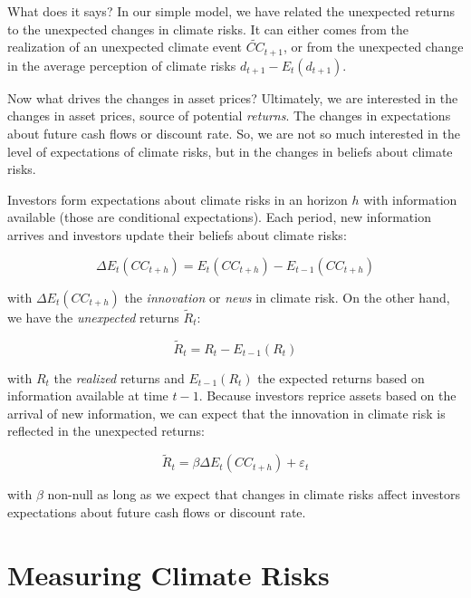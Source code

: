 What does it says? In our simple model, 
we have related the unexpected returns to the
unexpected changes in climate risks. It can 
either comes from the realization of an 
unexpected climate event $\tilde{CC}_{t+1}$,
or from the unexpected change in the average
perception of climate risks $d_{t+1} - E_t(d_{t+1})$.



Now what drives the changes in asset prices?
Ultimately, we are interested in the changes in asset prices,
source of potential \textit{returns}.
The changes in expectations about 
future cash flows or discount rate. 
So,
we are not so much interested in the level of
expectations of climate risks, but in the changes
in beliefs about climate risks.

Investors form expectations about climate risks
in an horizon $h$ with information available (those 
are conditional expectations).
Each period, new information arrives and investors
update their beliefs about climate risks:

\begin{equation}
    \Delta E_t (CC_{t+h}) = E_t(CC_{t+h}) - E_{t-1}(CC_{t+h})
\end{equation}

with $\Delta E_t (CC_{t+h})$ the \textit{innovation} or 
\textit{news} in climate risk. On the other hand, we have the \textit{unexpected} returns $\tilde{R}_t$:

\begin{equation}
    \tilde{R}_t = R_t - E_{t-1}(R_t)
\end{equation}

with $R_t$ the \textit{realized} returns 
and $E_{t-1}(R_t)$ the expected returns based on information available at time $t-1$.
Because investors reprice assets based on the arrival of new information,
we can expect that the innovation in climate risk is reflected in the unexpected returns:

\begin{equation}
    \tilde{R}_t = \beta \Delta E_t(CC_{t+h}) + \varepsilon_t
\end{equation}


with $\beta$ non-null as long as we expect 
that changes in climate risks affect investors 
expectations about future cash flows or discount rate.


\section{Measuring Climate Risks}

